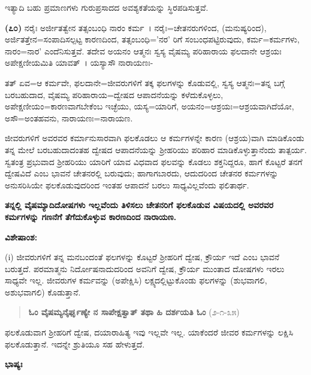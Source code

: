 ಇತ್ಯಾದಿ ಬಹು ಪ್ರಮಾಣಗಳು ಗುರುಪ್ರಸಾದದ ಅವಶ್ಯಕತೆಯನ್ನು ಸ್ಥಿರಪಡಿಸುತ್ತವೆ.

\textbf{(೭೦)} ನರೈಃ ಅರ್ಜೀತತ್ವೇನ ತತ್ಸಂಬಂಧಿ ನಾರಂ ಕರ್ಮ~। ನರೈಃ=ಚೇತನರುಗಳಿಂದ, (ಮನುಷ್ಯರಿಂದ), ಅರ್ಜಿತತ್ತೇನ=ಸಂಪಾದಿಸಲ್ಪಟ್ಟ ಕಾರಣದಿಂದ, ತತ್ಸಂಬಂಧಿ='ನರ' ರಿಗೆ ಸಂಬಂಧಪಟ್ಟಿರುವುದು, ಕರ್ಮ=ಕರ್ಮಗಳು, ನಾರಂ=ನಾರ' ಎಂದೆನಿಸುತ್ತವೆ. ತದೇವ ಅಯನಂ ಆತ್ಮನಃ ಸ್ವಸ್ಯ ವೈಷಮ್ಯ ಪರಿಹಾರಾಯ ಫಲದಾನೇ ಆಶ್ರಯಃ ಅಪೇಕ್ಷಣೀಯಮಿತಿ ಯಾವತ್~। ಯಸ್ಯಾಸೌ ನಾರಾಯಣಃ-

ತತ್ ಏವ=ಆ ಕರ್ಮವೇ, ಫಲದಾನೇ=ಜೀವರುಗಳಿಗೆ ತಕ್ಕ ಫಲಗಳನ್ನು ಕೊಡುವಲ್ಲಿ, ಸ್ವಸ್ಯ ಆತ್ಮನಃ=ತನ್ನ ಬಗ್ಗೆ ಬರಬಹುದಾದ, ವೈಷಮ್ಯ ಪರಿಹಾರಾಯ=ದ್ವೇಷದ ಆಪಾದನೆಯನ್ನು ಕಳೆದುಕೊಳ್ಳಲು, ಅಪೇಕ್ಷಣೀಯಂ=ಕಾರಣವಾಗಬೇಕೆಂಬ ಇಚ್ಛೆಯು, ಯಸ್ಯ=ಯಾರಿಗೆ, ಅಯನಂ=ಆಶ್ರಯಃ=ಆಶ್ರಯವಾಗಿದೆಯೋ, ಅಸೌ=ಅಂತಹವನು, ನಾರಾಯಣಃ=\break ನಾರಾಯಣ.

ಜೀವರುಗಳಿಗೆ ಅವರವರ ಕರ್ಮಾನುಸಾರವಾಗಿ ಫಲಕೊಡಲು ಆ ಕರ್ಮಗಳನ್ನೇ ಕಾರಣ (ಆಶ್ರಯ)ವಾಗಿ ಮಾಡಿಕೊಂಡು ತನ್ನ ಮೇಲೆ ಬರಬಹುದಾದಂತಹ ದ್ವೇಷದ ಆಪಾದನೆಯನ್ನು ಶ‍್ರೀಹರಿಯು ಪರಿಹಾರ ಮಾಡಿಕೊಳ್ಳುತ್ತಾನೆಂದು ತಾತ್ಪರ್ಯ. ಸ್ವತಂತ್ರ ಪ್ರಭುವಾದ ಶ‍್ರೀಹರಿಯು ಯಾರಿಗೆ ಯಾವ ವಿಧವಾದ ಫಲವನ್ನು ಕೊಡಲು ಶಕ್ತನಿದ್ದರೂ, ಹಾಗೆ ಕೊಟ್ಟರೆ ತನಗೆ ದ್ವೇಷವಿದೆ ಎಂಬ ಭಾವನೆ ಚೇತನರಲ್ಲಿ ಬರುವುದು; ಹಾಗಾಗಬಾರದು, ಆದುದರಿಂದ ಚೇತನರ ಕರ್ಮಗಳನ್ನು ಅನುಸರಿಸಿಯೇ ಫಲಕೊಡುವುದರಿಂದ ಇಂತಹ ಆಪಾದನೆ ಬರಲು ಸಾಧ್ಯವಿಲ್ಲವೆಂದು ಫಲಿತಾರ್ಥ.

\begin{center}
\textbf{ತನ್ನಲ್ಲಿ ವೈಷಮ್ಯಾದಿದೋಷಗಳು ಇಲ್ಲವೆಂದು ತಿಳಿಸಲು ಚೇತನರಿಗೆ ಫಲಕೊಡುವ ವಿಷಯದಲ್ಲಿ ಅವರವರ ಕರ್ಮಗಳನ್ನು ಗಣನೆಗೆ ತೆಗೆದುಕೊಳ್ಳುವ ಕಾರಣದಿಂದ ನಾರಾಯಣ.}
\end{center}

\noindent
\textbf{ವಿಶೇಷಾಂಶ:\enginline{-}}

(i) ಜೀವರುಗಳಿಗೆ ತನ್ನ ಮನಬಂದಂತೆ ಫಲಗಳನ್ನು ಕೊಟ್ಟರೆ ಶ‍್ರೀಹರಿಗೆ ದ್ವೇಷ, ಕ್ರೌರ್ಯ ಇದೆ ಎಂಬ ಭಾವನೆ ಬರುತ್ತದೆ. ಪರಮಾತ್ಮನು ನಿರ್ದೋಷನಾದುದರಿಂದ ಅವನಿಗೆ ದ್ವೇಷ, ಕ್ರೌರ್ಯ ಮುಂತಾದ ದೋಷಗಳು ಇರಲು ಸಾಧ್ಯವೇ ಇಲ್ಲ. ಜೀವರುಗಳ ಕರ್ಮವನ್ನು (ಅಪೇಕ್ಷಿಸಿ) ಲಕ್ಷ್ಯದಲ್ಲಿಟ್ಟುಕೊಂಡು ಫಲಗಳನ್ನು (ಶುಭವಾಗಲಿ, ಅಶುಭವಾಗಲಿ) ಕೊಡುತ್ತಾನೆ.

\vspace{-.1cm}

\begin{verse}
\textbf{ಓಂ ವೈಷಮ್ಯನೈರ್ಘೃಣ್ಯೇ ನ ಸಾಪೇಕ್ಷತ್ವಾತ್ ತಥಾ ಹಿ ದರ್ಶಯತಿ ಓಂ} (೨-೧-೩೫)
\end{verse}

\vspace{-.1cm}

ಫಲಕೊಡುವಾಗ ಶ‍್ರೀಹರಿಗೆ ದ್ವೇಷ, ದಯಾರಾಹಿತ್ಯ ಇವು ಇಲ್ಲವೇ ಇಲ್ಲ. ಯಾಕೆಂದರೆ ಜೀವರ ಕರ್ಮಗಳನ್ನು ಲಕ್ಷಿಸಿ ಫಲಕೊಡುತ್ತಾನೆ. ಇದನ್ನೇ ಶ್ರುತಿಯೂ ಸಹ ಹೇಳುತ್ತದೆ.

\newpage

\noindent
\textbf{ಭಾಷ್ಯಃ\enginline{-}}

\vspace{-.1cm}

